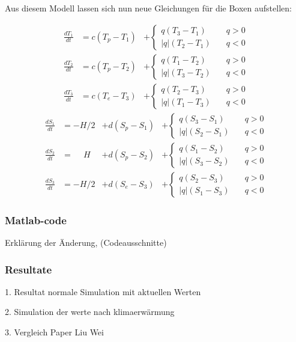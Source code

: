 Aus diesem Modell lassen sich nun neue Gleichungen für die Boxen aufstellen:

\begin{equation}
\begin{aligned}
\frac{dT_1}{dt} &= c(T_p-T_1)&+ \begin{cases} q(T_3-T_1) & \quad q>0 \\ |q|(T_2-T_1) & \quad q<0 \end{cases}
\\
\frac{dT_2}{dt} &= c(T_p-T_2)&+\begin{cases} q(T_1-T_2) & \quad q>0 \\ |q|(T_3-T_2) & \quad q<0 \end{cases}
\\
\frac{dT_3}{dt} &= c(T_e-T_3)&+\begin{cases} q(T_2-T_3) & \quad q>0 \\ |q|(T_1-T_3) & \quad q<0 \end{cases}
\end{aligned}
\end{equation}
\begin{equation}
\begin{aligned}
\frac{dS_1}{dt} &= -H/2 &+ d(S_p-S_1)&+\begin{cases} q(S_3-S_1) & \quad q>0 \\ |q|(S_2-S_1) & \quad q<0 \end{cases}
\\
\frac{dS_2}{dt} &= \phantom{-}H &+ d(S_p-S_2)&+\begin{cases} q(S_1-S_2) & \quad q>0 \\ |q|(S_3-S_2) & \quad q<0 \end{cases}	
\\
\frac{dS_3}{dt} &= -H/2 &+d(S_e-S_3)&+\begin{cases} q(S_2-S_3) & \quad q>0 \\ |q|(S_1-S_3) & \quad q<0 \end{cases}
\end{aligned}
\end{equation}	
\subsubsection{Matlab-code}

Erklärung der Änderung, (Codeausschnitte)


\subsubsection{Resultate} 

1. Resultat normale Simulation mit aktuellen Werten

2. Simulation der werte nach klimaerwärmung

3. Vergleich Paper Liu Wei


